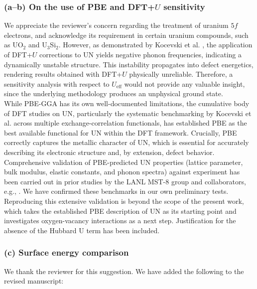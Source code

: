 \documentclass[12pt]{article}
\begin{document}
\color{black}


\subsubsection*{(a--b) On the use of PBE and DFT+$U$ sensitivity}

We appreciate the reviewer's concern regarding the treatment of uranium $5f$ electrons, and acknowledge its requirement in certain uranium compounds, such as UO$_2$ and U$_3$Si$_2$. However, as demonstrated by Kocevski et al. \cite{Kocevski2022I}, the application of DFT+$U$ corrections to UN yields negative phonon frequencies, indicating a dynamically unstable structure. This instability propagates into defect energetics, rendering results obtained with DFT+$U$ physically unreliable. Therefore, a sensitivity analysis with respect to $U_\text{eff}$ would not provide any valuable insight, since the underlying methodology produces an unphysical ground state.
\\

While PBE-GGA has its own well-documented limitations, the cumulative body of DFT studies on UN, particularly the systematic benchmarking by Kocevski et al. across multiple exchange-correlation functionals, has established PBE as the best available functional for UN within the DFT framework. Crucially, PBE correctly captures the metallic character of UN, which is essential for accurately describing its electronic structure and, by extension, defect behavior.
\\

Comprehensive validation of PBE-predicted UN properties (lattice parameter, bulk modulus, elastic constants, and phonon spectra) against experiment has been carried out in prior studies by the LANL MST-8 group and collaborators, e.g., \cite{Kocevski2022I,Kocevski2023,Cooper2023}. We have confirmed these benchmarks in our own preliminary tests. Reproducing this extensive validation is beyond the scope of the present work, which takes the established PBE description of UN as its starting point and investigates oxygen-vacancy interactions as a next step. Justification for the absence of the Hubbard U term has been included. 

\subsubsection*{(c) Surface energy comparison}

We thank the reviewer for this suggestion. We have added the following to the revised manuscript:
\end{document}
